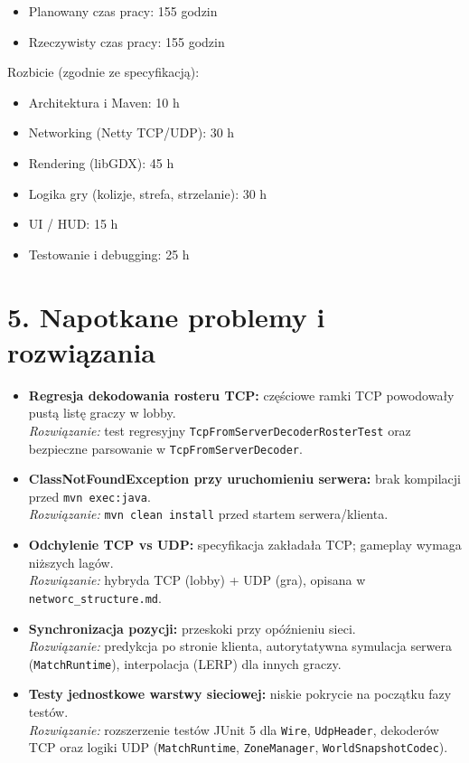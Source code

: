 \documentclass[a4paper,12pt]{article}
\begin{document}
\begin{itemize}
    \item Planowany czas pracy: 155 godzin
    \item Rzeczywisty czas pracy: 155 godzin
\end{itemize}

Rozbicie (zgodnie ze specyfikacją):
\begin{itemize}
    \item Architektura i Maven: 10 h
    \item Networking (Netty TCP/UDP): 30 h
    \item Rendering (libGDX): 45 h
    \item Logika gry (kolizje, strefa, strzelanie): 30 h
    \item UI / HUD: 15 h
    \item Testowanie i debugging: 25 h
\end{itemize}

\section*{5. Napotkane problemy i rozwiązania}

\begin{itemize}
    \item \textbf{Regresja dekodowania rosteru TCP:} częściowe ramki TCP powodowały pustą listę graczy w lobby.\\
    \textit{Rozwiązanie:} test regresyjny \texttt{TcpFromServerDecoderRosterTest} oraz bezpieczne parsowanie w \texttt{TcpFromServerDecoder}.

    \item \textbf{ClassNotFoundException przy uruchomieniu serwera:} brak kompilacji przed \texttt{mvn exec:java}.\\
    \textit{Rozwiązanie:} \texttt{mvn clean install} przed startem serwera/klienta.

    \item \textbf{Odchylenie TCP vs UDP:} specyfikacja zakładała TCP; gameplay wymaga niższych lagów.\\
    \textit{Rozwiązanie:} hybryda TCP (lobby) + UDP (gra), opisana w \texttt{networc\_structure.md}.

    \item \textbf{Synchronizacja pozycji:} przeskoki przy opóźnieniu sieci.\\
    \textit{Rozwiązanie:} predykcja po stronie klienta, autorytatywna symulacja serwera (\texttt{MatchRuntime}), interpolacja (LERP) dla innych graczy.

    \item \textbf{Testy jednostkowe warstwy sieciowej:} niskie pokrycie na początku fazy testów.\\
    \textit{Rozwiązanie:} rozszerzenie testów JUnit 5 dla \texttt{Wire}, \texttt{UdpHeader}, dekoderów TCP oraz logiki UDP (\texttt{MatchRuntime}, \texttt{ZoneManager}, \texttt{WorldSnapshotCodec}).
\end{itemize}
\end{document}
